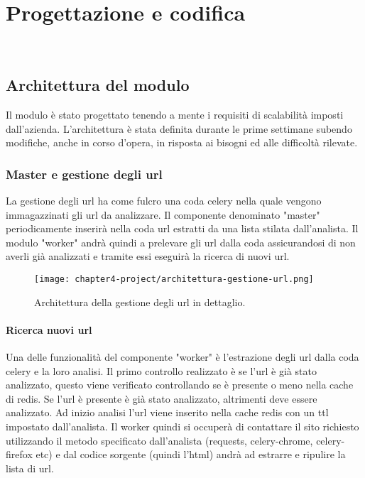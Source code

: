 
\chapter{Progettazione e codifica}
\label{cap:progettazione-codifica}

\\

\section{Architettura del modulo}

Il modulo è stato progettato tenendo a mente i requisiti di scalabilità imposti dall'azienda. L'architettura è stata definita durante le prime settimane subendo modifiche, anche in corso d'opera, in risposta ai bisogni ed alle difficoltà rilevate.

\subsection{Master e gestione degli url}

La gestione degli url ha come fulcro una coda celery nella quale vengono immagazzinati gli url da analizzare. Il componente denominato "master" periodicamente inserirà nella coda url estratti da una lista stilata dall'analista. Il modulo "worker" andrà quindi a prelevare gli url dalla coda assicurandosi di non averli già analizzati e tramite essi eseguirà la ricerca di nuovi url. 


\begin{figure}[!h] 
    \centering 
    \texttt{[image: chapter4-project/architettura-gestione-url.png]} 
    \caption{Architettura della gestione degli url in dettaglio.}
\end{figure}

\subsubsection{Ricerca nuovi url}

Una delle funzionalità del componente "worker" è l'estrazione degli url dalla coda celery e la loro analisi. Il primo controllo realizzato è se l'url è già stato analizzato, questo viene verificato controllando se è presente o meno nella cache di redis. Se l'url è presente è già stato analizzato, altrimenti deve essere analizzato. Ad inizio analisi l'url viene inserito nella cache redis con un ttl impostato dall'analista. Il worker quindi si occuperà di contattare il sito richiesto utilizzando il metodo specificato dall'analista (requests, celery-chrome, celery-firefox etc) e dal codice sorgente (quindi l'html) andrà ad estrarre e ripulire la lista di url. 


